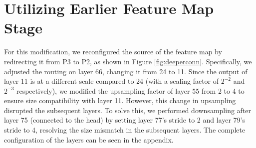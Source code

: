 \section{Utilizing Earlier Feature Map Stage}
For this modification, we reconfigured the source of the feature map by redirecting it from P3 to P2, as shown in Figure \ref{fig:deeperconn}.
Specifically, we adjusted the routing on layer 66, changing it from 24 to 11. 
Since the output of layer 11 is at a different scale compared to 24 (with a scaling factor of $2^{-2}$ and $2^{-3}$ respectively), 
we modified the upsampling factor of layer 55 from 2 to 4 to ensure size compatibility with layer 11. 
However, this change in upsampling disrupted the subsequent layers. 
To solve this, we performed downsampling after layer 75 (connected to the head) by setting layer 77's stride to 2 and layer 79's stride to 4, 
resolving the size mismatch in the subsequent layers.
The complete configuration of the layers can be seen in the appendix. %



